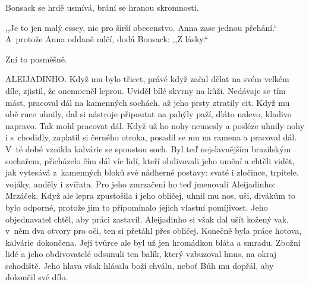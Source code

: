 Bonsack se hrdě usmívá, brání se hranou skromností.

,,Je to jen malý essey, nic pro širší obecenstvo. Anna zase jednou přehání.`` A~protože Anna oddaně mlčí, dodá Bonsack: ,,Z lásky.``

Zní to posměšně.

\medskip

\noindent
ALEIJADINHO. Když mu bylo třicet, právé když začal dělat na svém velkém díle, zjistil, že onemocněl leprou. Uviděl bílé skvrny na kůži. Nedávaje se tím mást, pracoval dál na kamenných sochách, až jeho prsty ztratily cit. Když mu obě ruce uhnily, dal si nástroje připoutat na pahýly paží, dláto nalevo, kladivo napravo. Tak mohl pracovat dál. Když už ho nohy neunesly a posléze uhnily nohy i s~chodidly, zaplatil si černého otroka, posadil se mu na ramena a pracoval dál. V~té dobé vznikla kalvárie se spoustou soch. Byl teď nejslavnějším brazilským sochařem, přicházelo čím dál víc lidí, kteří obdivovali jeho umění a chtěli vidět, jak vytesává z~kamenných bloků své nádherné postavy: svaté i zločince, trpitele, vojáky, anděly i zvířata. Pro jeho zmrzačení ho teď jmenovali Aleijadinho: Mrzáček. Když ale lepra zpustošila i jeho obličej, uhnil mu nos, uši, divákům to bylo odporné, protože jim to připomínalo jejich vlastní pomíjivost. Jeho objednavatel chtěl, aby práci zastavil. Aleijadinho si však dal ušít kožený vak, v~něm dva otvory pro oči, ten si přetáhl přes obličej. Konečně byla práce hotova, kalvárie dokončena. Její tvůrce ale byl už jen hromádkou bláta a smradu. Zbožní lidé a jeho obdivovatelé odsunuli ten balík, který vzbuzoval hnus, na okraj schodiště. Jeho hlava však hlásala boží chválu, neboť Bůh mu dopřál, aby dokončil své dílo.

